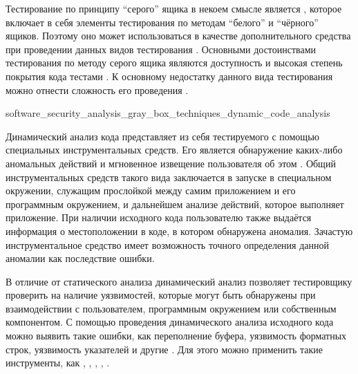 %
Тестирование по принципу ``серого'' ящика в некоем смысле является , которое включает в себя элементы тестирования по методам ``белого'' и ``чёрного'' ящиков. 
%
Поэтому оно может использоваться в качестве дополнительного средства при проведении данных видов тестирования . 
%
Основными достоинствами тестирования по методу серого ящика являются доступность и высокая степень покрытия кода тестами . 
%
К основному недостатку данного вида тестирования можно отнести сложность его проведения .


	{software_security_analysis_gray_box_techniques_dynamic_code_analysis}

%
Динамический анализ кода представляет из себя  тестируемого  с помощью специальных инструментальных средств. 
%
Его  является  обнаружение каких-либо аномальных действий и мгновенное извещение пользователя об этом . 
%
Общий  инструментальных средств такого вида заключается в запуске  в специальном окружении, служащим прослойкой между самим приложением и его программным окружением, и дальнейшем анализе действий, которое выполняет приложение. 
%
При наличии исходного кода пользователю также выдаётся информация о местоположении в коде, в котором обнаружена аномалия. 
%
Зачастую инструментальное средство имеет возможность точного определения данной аномалии как последствие ошибки.

В отличие от статического анализа динамический анализ позволяет тестировщику проверить  на наличие уязвимостей, которые могут быть обнаружены при взаимодействии с пользователем, программным окружением или собственным компонентом. 
%
С помощью проведения динамического анализа исходного кода можно выявить такие ошибки, как переполнение буфера, уязвимость форматных строк, уязвимость указателей и другие . 
%
Для этого можно применить такие инструменты, как  ,  ,  ,  ,  .


